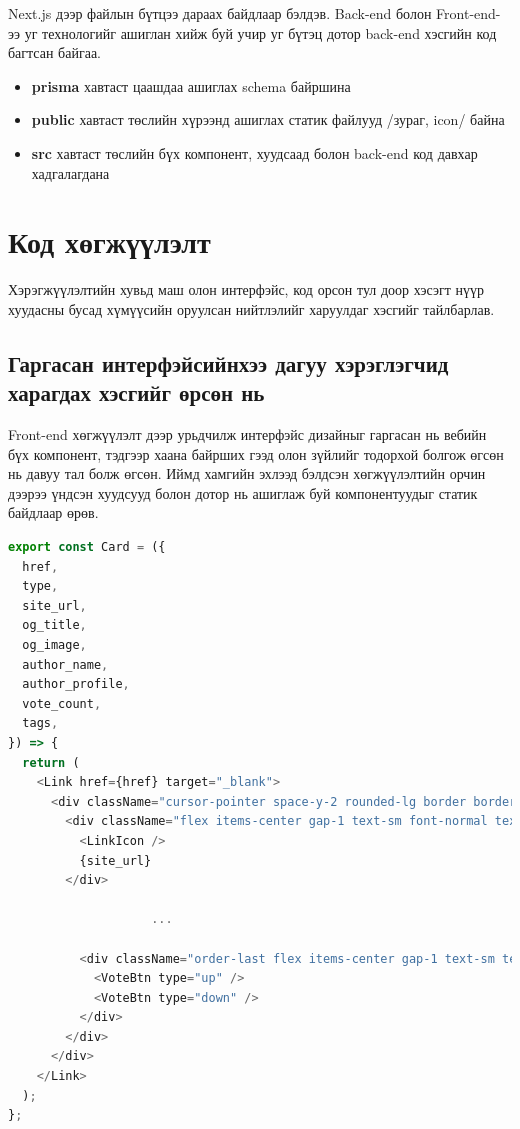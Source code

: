 Next.js дээр файлын бүтцээ дараах байдлаар бэлдэв. Back-end болон Front-end-ээ уг технологийг ашиглан хийж буй учир уг бүтэц дотор back-end хэсгийн код багтсан байгаа.

\begin{itemize}
	\item \textbf{prisma} хавтаст цаашдаа ашиглах schema байршина
	\item \textbf{public} хавтаст төслийн хүрээнд ашиглах статик файлууд /зураг, icon/ байна
	\item \textbf{src} хавтаст төслийн бүх компонент, хуудсаад болон back-end код давхар хадгалагдана
\end{itemize}

\section{Код хөгжүүлэлт}

Хэрэгжүүлэлтийн хувьд маш олон интерфэйс, код орсон тул доор хэсэгт нүүр хуудасны бусад хүмүүсийн оруулсан нийтлэлийг харуулдаг хэсгийг тайлбарлав.

\subsection{Гаргасан интерфэйсийнхээ дагуу хэрэглэгчид харагдах хэсгийг өрсөн нь}

Front-end хөгжүүлэлт дээр урьдчилж интерфэйс дизайныг гаргасан нь вебийн бүх компонент, тэдгээр хаана байрших гээд олон зүйлийг тодорхой болгож өгсөн нь давуу тал болж өгсөн. Иймд хамгийн эхлээд бэлдсэн хөгжүүлэлтийн орчин дээрээ үндсэн хуудсууд болон дотор нь ашиглаж буй компонентуудыг статик байдлаар өрөв. 

\begin{lstlisting}[language=Javascript, caption=Хэрэглэгчийн оруулсан холбоосын харагдах компонент, frame=single]
	export const Card = ({
  href,
  type,
  site_url,
  og_title,
  og_image,
  author_name,
  author_profile,
  vote_count,
  tags,
}) => {
  return (
    <Link href={href} target="_blank">
      <div className="cursor-pointer space-y-2 rounded-lg border border-gray200 bg-gray300 p-3.5 transition-all duration-300 hover:border-gray100 hover:bg-white hover:shadow-sm">
        <div className="flex items-center gap-1 text-sm font-normal text-description">
          <LinkIcon />
          {site_url}
        </div>
	       
					...

          <div className="order-last flex items-center gap-1 text-sm text-description">
            <VoteBtn type="up" />
            <VoteBtn type="down" />
          </div>
        </div>
      </div>
    </Link>
  );
};
			
\end{lstlisting}



